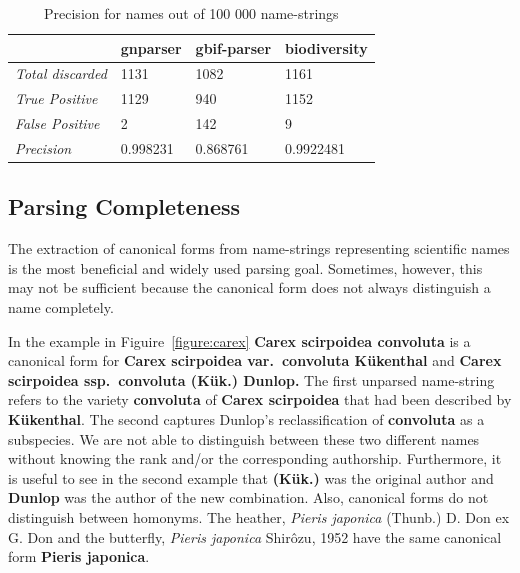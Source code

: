 \documentclass{bmcart}
\begin{document}
\begin{table}[htb]
  \begin{center}
    \caption{Precision for names  out of 100 000
    name-strings}\label{table:unparsed}
    \resizebox{10cm}{!} {\begin{tabular}{| l | *{3}{l} |}
      \hline
                              & gnparser & gbif-parser & biodiversity \\
      \hline
      \textit{Total discarded}& 1131     & 1082        & 1161         \\
      \textit{True Positive}  & 1129     & 940         & 1152         \\
      \textit{False Positive} & 2        & 142         & 9            \\
      \textit{Precision}      & 0.998231 & 0.868761    & 0.9922481    \\
      \hline
    \end{tabular}
  }
  \end{center}
\end{table}

\subsection*{Parsing Completeness}

The extraction of canonical forms from name-strings representing scientific names is the most beneficial and widely used parsing goal. Sometimes, however, this may not be sufficient because the canonical form does not always distinguish a name completely.

In the example in Figuire~\ref{figure:carex} \textbf{Carex scirpoidea convoluta} is a canonical form for \textbf{Carex scirpoidea var.\ convoluta Kükenthal} and \textbf{Carex scirpoidea ssp.\ convoluta (Kük.) Dunlop.} The first unparsed name-string refers to the variety \textbf{convoluta} of \textbf{Carex scirpoidea} that had been described by \textbf{Kükenthal}. The second captures Dunlop's reclassification of \textbf{convoluta} as a subspecies. We are not able to distinguish between these two different names without knowing the rank and/or the corresponding authorship. Furthermore, it is useful to see in the second example that \textbf{(Kük.)} was the original author and \textbf{Dunlop} was the author of the new combination. Also, canonical forms do not distinguish between homonyms. The heather,  \textit{Pieris japonica} (Thunb.) D. Don ex G. Don and the butterfly, \textit{Pieris japonica} Shirôzu, 1952 have the same canonical form \textbf{Pieris japonica}.
\end{document}
